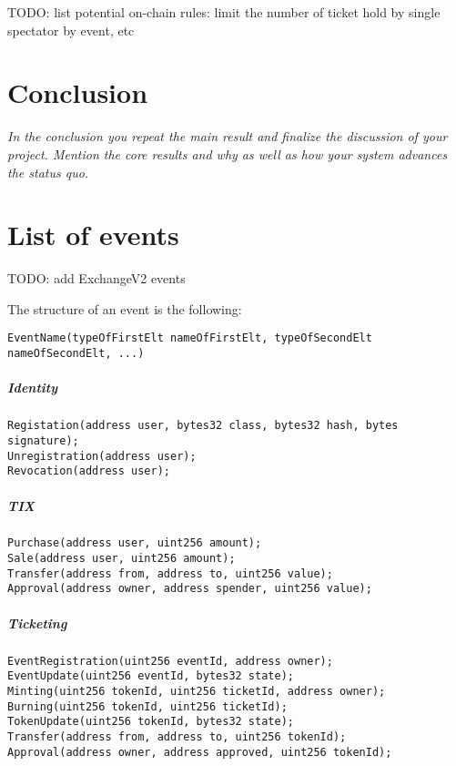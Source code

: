 \documentclass[a4paper,11pt,oneside]{report}
\begin{document}
TODO: list potential on-chain rules: limit the number of ticket hold by single spectator by event, etc

\chapter{Conclusion}

\textit{In the conclusion you repeat the main result and finalize the discussion of
your project. Mention the core results and why as well as how your system
advances the status quo.} \\

\cleardoublepage
{}
{}
\nocite{*}
\printbibliography

\appendix
\chapter{List of events}
\label{sec:appendix_a}

TODO: add ExchangeV2 events

The structure of an event is the following: 
\begin{verbatim}
EventName(typeOfFirstElt nameOfFirstElt, typeOfSecondElt nameOfSecondElt, ...)
\end{verbatim}



\paragraph{Identity}
\begin{verbatim}
Registation(address user, bytes32 class, bytes32 hash, bytes signature);
Unregistration(address user);
Revocation(address user);
\end{verbatim}

\paragraph{TIX}
\begin{verbatim}
Purchase(address user, uint256 amount);
Sale(address user, uint256 amount);
Transfer(address from, address to, uint256 value);
Approval(address owner, address spender, uint256 value);
\end{verbatim}

\paragraph{Ticketing}
\begin{verbatim}
EventRegistration(uint256 eventId, address owner);
EventUpdate(uint256 eventId, bytes32 state);
Minting(uint256 tokenId, uint256 ticketId, address owner);
Burning(uint256 tokenId, uint256 ticketId);
TokenUpdate(uint256 tokenId, bytes32 state);
Transfer(address from, address to, uint256 tokenId);
Approval(address owner, address approved, uint256 tokenId);
\end{verbatim}
\end{document}
